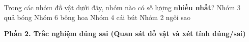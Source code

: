 \begin{ex} %
Trong các nhóm đồ vật dưới đây, nhóm nào có số lượng \textbf{nhiều nhất}?
\choice
{Nhóm 3 quả bóng}
{\True Nhóm 6 bông hoa}
{Nhóm 4 cái bút}
{Nhóm 2 ngôi sao}
\end{ex}

\newpage
\textbf{Phần 2. Trắc nghiệm đúng sai (Quan sát đồ vật và xét tính đúng/sai)}

